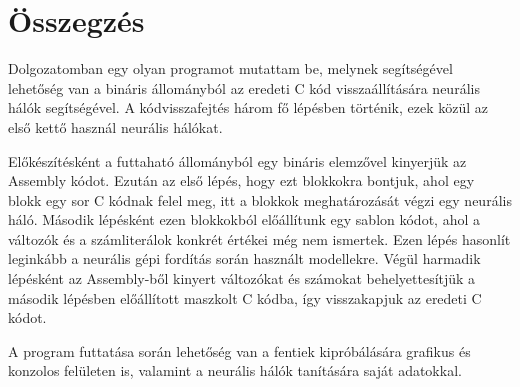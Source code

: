 \chapter{Összegzés}
\label{ch:sum}
Dolgozatomban egy olyan programot mutattam be, melynek segítségével lehetőség van
a bináris állományból az eredeti C kód visszaállítására neurális hálók segítségével.
A kódvisszafejtés három fő lépésben történik, ezek közül az első kettő használ
neurális hálókat.

Előkészítésként a futtaható állományból egy bináris elemzővel kinyerjük az Assembly kódot.
Ezután az első lépés, hogy ezt blokkokra bontjuk, ahol egy blokk egy sor C kódnak felel meg,
itt a blokkok meghatározását végzi egy neurális háló. Második lépésként ezen blokkokból előállítunk
egy sablon kódot, ahol a változók és a számliterálok konkrét értékei még nem ismertek. Ezen lépés
hasonlít leginkább a neurális gépi fordítás során használt modellekre. Végül harmadik lépésként az
Assembly-ből kinyert változókat és számokat behelyettesítjük a második lépésben előállított maszkolt C
kódba, így visszakapjuk az eredeti C kódot.

A program futtatása során lehetőség van a fentiek kipróbálására grafikus és konzolos felületen is,
valamint a neurális hálók tanítására saját adatokkal.
